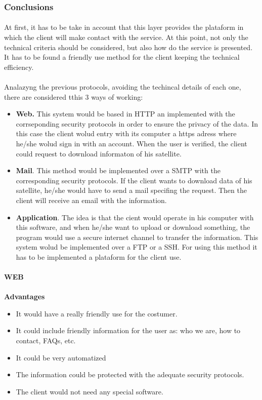 \subsubsection{Conclusions}
\paragraph{}
At first, it has to be take in account that this layer provides the plataform in which the client will make contact with the service. At this point, not only the technical criteria should be considered, but also how do the service is presented. It has to be found a friendly use method for the client keeping the technical efficiency.
\paragraph{}
Analazyng the previous protocols, avoiding the techincal details of each one, there are considered tthis 3 ways of working:
\begin{itemize}
\item \textbf{Web.} This system would be based in HTTP an implemented with the corrseponding security protocols in order to ensure the privacy of the data. In this case the client wolud entry with its computer a https adress where he/she wolud sign in with an account. When the user is verified, the client could request to download informaton of his satellite. 
\item \textbf{Mail}. This method would be implemented over a SMTP with the corresponding security protocols. If the client wants to download data of his satellite, he/she would have to send a mail specifing the request. Then the client will receive an email with the information.
\item \textbf{Application}.  The idea is that the cient would operate in his computer with this software, and when he/she want to upload or download something, the program would use a secure internet channel to transfer the information. This system wolud be implemented over a FTP or a SSH. For using this method it has to be implemented a plataform for the client use.
\end{itemize}

\paragraph{} \textbf{WEB}
\paragraph{} \textbf{Advantages}
\begin{itemize}
\item It would have a really friendly use for the costumer. 
\item It could include friendly information for the user as: who we are, how to contact, FAQs, etc.
\item It could be very automatized
\item The information could be protected with the adequate security protocols.
\item The client would not need any special software.
\end{itemize}
